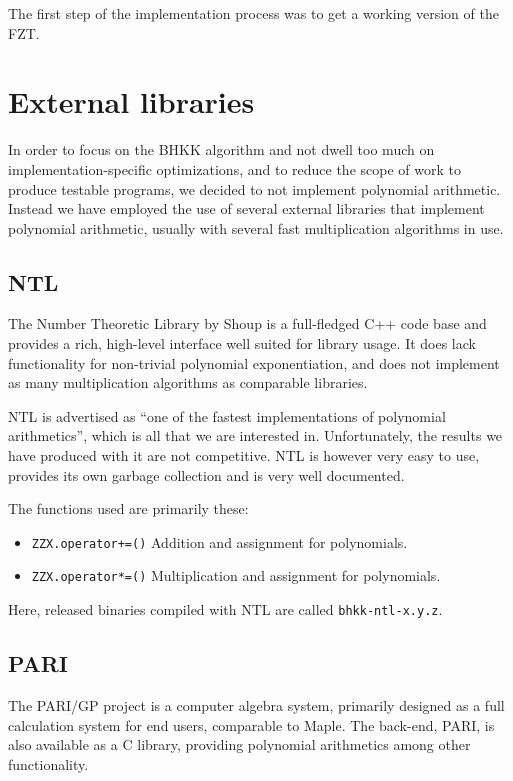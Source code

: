 \documentclass{cslthse-msc}
\newcommand{\code}{\texttt}
\begin{document}
The first step of the implementation process was to get a working version of the FZT. 


\section{External libraries}
In order to focus on the BHKK algorithm and not dwell too much on implementation-specific optimizations, and to reduce the scope of work to produce testable programs, we decided to not implement polynomial arithmetic. Instead we have employed the use of several external libraries that implement polynomial arithmetic, usually with several fast multiplication algorithms in use.

\subsection{NTL}
The Number Theoretic Library by Shoup \cite{ntl} is a full-fledged C++ code base and provides a rich, high-level interface well suited for library usage. It does lack functionality for non-trivial polynomial exponentiation, and does not implement as many multiplication algorithms as comparable libraries.

NTL is advertised as ``one of the fastest implementations of polynomial arithmetics'', which is all that we are interested in. Unfortunately, the results we have produced with it are not competitive. NTL is however very easy to use, provides its own garbage collection and is very well documented.

The functions used are primarily these: 

\begin{itemize}
\item \code{ZZX.operator+=()}
\subitem Addition and assignment for polynomials. %
\item \code{ZZX.operator*=()}
\subitem Multiplication and assignment for polynomials. %
\end{itemize}

Here, released binaries compiled with NTL are called \code{bhkk-ntl-x.y.z}.

\subsection{PARI}
The PARI/GP project \cite{pari} is a computer algebra system, primarily designed as a full calculation system for end users, comparable to Maple. The back-end, PARI, is also available as a C library, providing polynomial arithmetics among other functionality.
\end{document}
